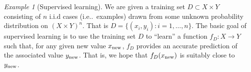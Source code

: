 \documentclass[ecta,nameyear,draft]{econsocart}
\makeatletter
\newcommand{\preceqb}{\mathbin{\preceq}}
\newcommand\ie{i\@.e\@ifnextchar.{}{.\@}}
\theoremstyle{plain}
\theoremstyle{remark}
\newtheorem{example}{Example}%
\makeatother
\begin{document}
\begin{example}[Supervised learning]\label{eg-supervised} We are given a
  training set $D \subset X\times Y$ consisting of $n$ i.i.d cases (\ie\
  examples) drawn from some unknown probability distribution on $(X\times
  Y)^n$. That is $ D = \{(x_i, y_i): i = 1, \dots, n\}$. The basic goal of
  supervised learning is to use the training set $D$ to ``learn'' a function
  $f_D: X \rightarrow Y$ such that, for any given new value $x_{\textup{new}}$,
  $f_D$ provides an accurate prediction of the associated value
  $y_\textup{new}$. That is, we hope that $f_D(x_\textup{new})$ is suitably
  close to $y_\textup{new}$.
\end{example}

%
%
%
%
%
%
%
%
%
%
%
\end{document}
